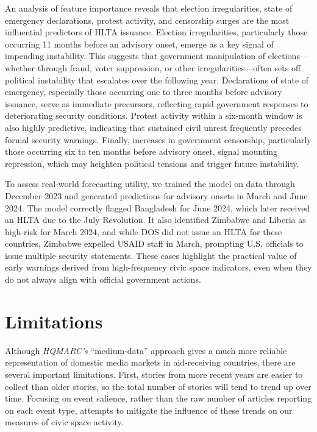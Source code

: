 \documentclass[
  letterpaper,
  DIV=11,
  numbers=noendperiod]{scrartcl}
\begin{document}
An analysis of feature importance reveals that election irregularities,
state of emergency declarations, protest activity, and censorship surges
are the most influential predictors of HLTA issuance. Election
irregularities, particularly those occurring 11 months before an
advisory onset, emerge as a key signal of impending instability. This
suggests that government manipulation of elections---whether through
fraud, voter suppression, or other irregularities---often sets off
political instability that escalates over the following year.
Declarations of state of emergency, especially those occurring one to
three months before advisory issuance, serve as immediate precursors,
reflecting rapid government responses to deteriorating security
conditions. Protest activity within a six-month window is also highly
predictive, indicating that sustained civil unrest frequently precedes
formal security warnings. Finally, increases in government censorship,
particularly those occurring six to ten months before advisory onset,
signal mounting repression, which may heighten political tensions and
trigger future instability.

To assess real-world forecasting utility, we trained the model on data
through December 2023 and generated predictions for advisory onsets in
March and June 2024. The model correctly flagged Bangladesh for June
2024, which later received an HLTA due to the July Revolution. It also
identified Zimbabwe and Liberia as high-risk for March 2024, and while
DOS did not issue an HLTA for these countries, Zimbabwe expelled USAID
staff in March, prompting U.S. officials to issue multiple security
statements. These cases highlight the practical value of early warnings
derived from high-frequency civic space indicators, even when they do
not always align with official government actions.

\hypertarget{sec-limitations}{%
\section{Limitations}\label{sec-limitations}}

Although \emph{HQMARC's} ``medium-data'' approach gives a much more
reliable representation of domestic media markets in aid-receiving
countries, there are several important limitations. First, stories from
more recent years are easier to collect than older stories, so the total
number of stories will tend to trend up over time. Focusing on event
salience, rather than the raw number of articles reporting on each event
type, attempts to mitigate the influence of these trends on our measures
of civic space activity.
\end{document}
